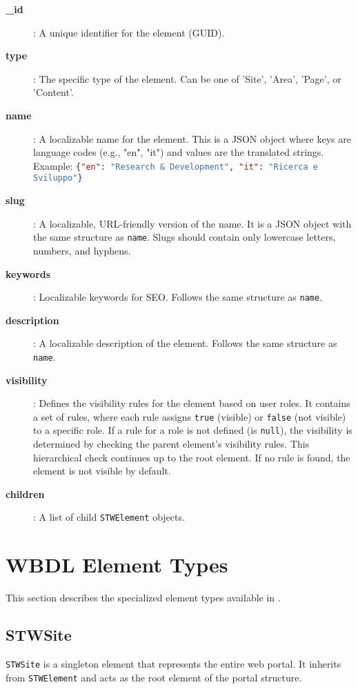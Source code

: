 \begin{description}
\item[\textbf{\_id}]: A unique identifier for the element (GUID).
\item[\textbf{type}]: The specific type of the element. Can be one of 'Site', 'Area', 'Page', or 'Content'.
\item[\textbf{name}]: A localizable name for the element. This is a JSON object where keys are language codes (e.g., "en", "it") and values are the translated strings. Example: \lstinline[language=JSON]|{"en": "Research & Development", "it": "Ricerca e Sviluppo"}|
\item[\textbf{slug}]: A localizable, URL-friendly version of the name. It is a JSON object with the same structure as \texttt{name}. Slugs should contain only lowercase letters, numbers, and hyphens.
\item[\textbf{keywords}]: Localizable keywords for SEO. Follows the same structure as \texttt{name}.
\item[\textbf{description}]: A localizable description of the element. Follows the same structure as \texttt{name}.
\item[\textbf{visibility}]: Defines the visibility rules for the element based on user roles. It contains a set of rules, where each rule assigns \texttt{true} (visible) or \texttt{false} (not visible) to a specific role. If a rule for a role is not defined (is \texttt{null}), the visibility is determined by checking the parent element's visibility rules. This hierarchical check continues up to the root element. If no rule is found, the element is not visible by default.
\item[\textbf{children}]: A list of child \texttt{STWElement} objects.
\end{description}

\section{WBDL Element Types}
\label{sec:wbdl-element-types}

This section describes the specialized element types available in \wbdl{}.

\subsection{STWSite}

	\texttt{STWSite} is a singleton element that represents the entire web portal. It inherits from \texttt{STWElement} and acts as the root element of the portal structure.

